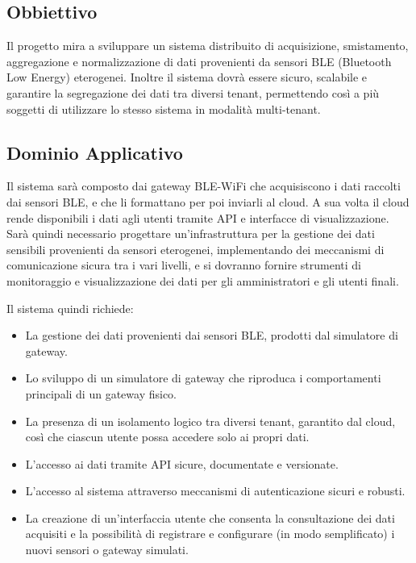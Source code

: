 \documentclass[a4paper,12pt]{article}
\begin{document}
    \subsection{Obbiettivo}
    Il progetto mira a sviluppare un sistema distribuito di acquisizione, smistamento, aggregazione e normalizzazione di dati provenienti da sensori BLE (Bluetooth Low Energy) eterogenei. Inoltre il sistema dovrà essere sicuro, scalabile e garantire la segregazione dei dati tra diversi tenant, permettendo così a più soggetti di utilizzare lo stesso sistema in modalità multi-tenant.
    \subsection{Dominio Applicativo}
    Il sistema sarà composto dai gateway BLE-WiFi che acquisiscono i dati raccolti dai sensori BLE, e che li formattano per poi inviarli al cloud. A sua volta il cloud rende disponibili i dati agli utenti tramite API e interfacce di visualizzazione. Sarà quindi necessario progettare un’infrastruttura per la gestione dei dati sensibili provenienti da sensori eterogenei, implementando dei meccanismi di comunicazione sicura tra i vari livelli, e si dovranno fornire strumenti di monitoraggio e visualizzazione dei dati per gli amministratori e gli utenti finali.
    
    Il sistema quindi richiede:
    \begin{itemize}
		\item La gestione dei dati provenienti dai sensori BLE, prodotti dal simulatore di gateway.
		\item Lo sviluppo di un simulatore di gateway che riproduca i comportamenti principali di un gateway fisico.
		\item La presenza di un isolamento logico tra diversi tenant, garantito dal cloud, così che ciascun utente possa accedere solo ai propri dati.
		\item L’accesso ai dati tramite API sicure, documentate e versionate.
		\item L’accesso al sistema attraverso meccanismi di autenticazione sicuri e robusti.
		\item La creazione di un’interfaccia utente che consenta la consultazione dei dati acquisiti e la possibilità di registrare e configurare (in modo semplificato) i nuovi sensori o gateway simulati.
    \end{itemize}
\end{document}
